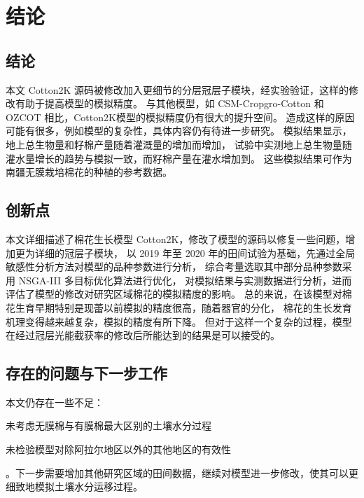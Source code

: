 \chapter{结论}
\section{结论}

本文 Cotton2K 源码被修改加入更细节的分层冠层子模块，经实验验证，这样的修改有助于提高模型的模拟精度。%
与其他模型，如 CSM-Cropgro-Cotton 和 OZCOT 相比，Cotton2K模型的模拟精度仍有很大的提升空间。%
造成这样的原因可能有很多，例如模型的复杂性，具体内容仍有待进一步研究。%
模拟结果显示，地上总生物量和籽棉产量随着灌溉量的增加而增加，%
试验中实测地上总生物量随灌水量增长的趋势与模拟一致，而籽棉产量在灌水增加到。%
这些模拟结果可作为南疆无膜栽培棉花的种植的参考数据。

\section{创新点}
本文详细描述了棉花生长模型 Cotton2K，修改了模型的源码以修复一些问题，增加更为详细的冠层子模块，%
以 2019 年至 2020 年的田间试验为基础，先通过全局敏感性分析方法对模型的品种参数进行分析，%
综合考量选取其中部分品种参数采用 NSGA-III 多目标优化算法进行优化，%
对模拟结果与实测数据进行分析，进而评估了模型的修改对研究区域棉花的模拟精度的影响。%
总的来说，在该模型对棉花生育早期特别是现蕾以前模拟的精度很高，随着器官的分化，%
棉花的生长发育机理变得越来越复杂，模拟的精度有所下降。%
但对于这样一个复杂的过程，模型在经过冠层光能截获率的修改后所能达到的结果是可以接受的。%

\section{存在的问题与下一步工作}

本文仍存在一些不足：
\begin{enumerate*}
    \item 未考虑无膜棉与有膜棉最大区别的土壤水分过程
    \item 未检验模型对除阿拉尔地区以外的其他地区的有效性
\end{enumerate*}。下一步需要增加其他研究区域的田间数据，继续对模型进一步修改，使其可以更细致地模拟土壤水分运移过程。